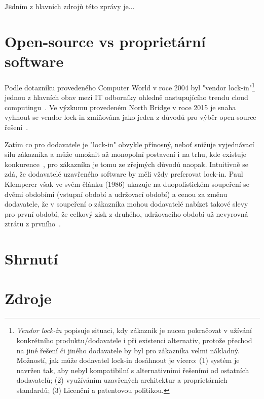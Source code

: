 \begin{multicols}{2}
\lettrine[nindent=0em,lines=3]{J}edním z hlavních zdrojů této zprávy je... 


\section{Open-source vs proprietární software}
Podle dotazníku provedeného Computer World v roce 2004 byl "vendor lock-in"\footnote{{\em Vendor lock-in} popisuje situaci, kdy zákazník je nucen pokračovat v užívání konkrétního produktu/dodavatele i při existenci alternativ, protože přechod na jiné řešení či jiného dodavatele by byl pro zákazníka velmi nákladný. Možností, jak může dodavatel lock-in dosáhnout je vícero: (1) systém je navržen tak, aby nebyl kompatibilní s alternativními řešeními od ostatních dodavatelů; (2) využíváním uzavřených architektur a proprietárních standardů; (3) Licenční a patentovou politikou.} jednou z hlavních obav mezi IT odborníky ohledně nastupujícího trendu cloud computingu~\cite{computer-world-2004}. Ve výzkumu provedeném North Bridge v roce 2015 je snaha vyhnout se vendor lock-in zmiňována jako jeden z důvodů pro výběr open-source řešení~\cite{survey-2015}.

Zatím co pro dodavatele je "lock-in" obvykle přínosný, neboť snižuje
vyjednávací sílu zákazníka a může umožnit až monopolní postavení i na trhu,
kde existuje konkurence~\cite[str. 1]{lock-in-competition}, pro zákazníka
je tomu ze zřejmých důvodů naopak. Intuitivně se zdá, že dodavatelé
uzavřeného software by měli vždy preferovat lock-in. Paul Klemperer však ve
svém článku (1986) ukazuje na duopolistickém soupeření se dvěmi obdobími
(vstupní období a udržovací období) a cenou za změnu dodavatele, že v soupeření o zákazníka mohou dodavatelé nabízet takové slevy pro první období, že celkový zisk z druhého, udržovacího období už nevyrovná ztrátu z prvního~\cite{klemperer-switching-costs}.




\section{Shrnutí}







\section{Zdroje}
%


\end{multicols}
